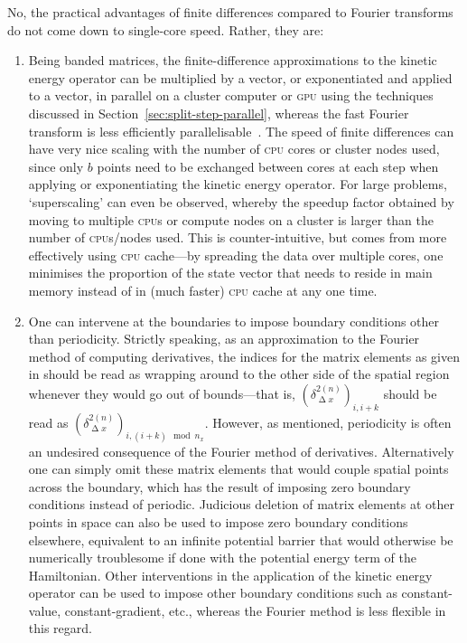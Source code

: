 No, the practical advantages of finite differences compared to Fourier transforms do not come down to single-core speed. Rather, they are:
\begin{enumerate}
    \item Being banded matrices, the finite-difference approximations to the kinetic energy operator can be multiplied by a vector, or exponentiated and applied to a vector, in parallel on a cluster computer or \textsc{gpu} using the techniques discussed in Section~\ref{sec:split-step-parallel}, whereas the fast Fourier transform is less efficiently parallelisable~\cite{Gupta93thescalability}. The speed of finite differences can have very nice scaling with the number of \textsc{cpu} cores or cluster nodes used, since only $b$ points need to be exchanged between cores at each step when applying or exponentiating the kinetic energy operator. For large problems, `superscaling' can even be observed, whereby the speedup factor obtained by moving to multiple \textsc{cpu}s or compute nodes on a cluster is larger than the number of \textsc{cpu}s/nodes used. This is counter-intuitive, but comes from more effectively using \textsc{cpu} cache---by spreading the data over multiple cores, one minimises the proportion of the state vector that needs to reside in main memory instead of in (much faster) \textsc{cpu} cache at any one time.
    \item One can intervene at the boundaries to impose boundary conditions other than periodicity. Strictly speaking, as an approximation to the Fourier method of computing derivatives, the indices for the matrix elements as given in  should be read as wrapping around to the other side of the spatial region whenever they would go out of bounds---that is, $(\delta^{2 (n)}_{\upDelta x})_{i, i + k}$ should be read as $(\delta^{2 (n)}_{\upDelta x})_{i, (i + k) \mod n_x}$. However, as mentioned, periodicity is often an undesired consequence of the Fourier method of derivatives. Alternatively one can simply omit these matrix elements that would couple spatial points across the boundary, which has the result of imposing zero boundary conditions instead of periodic. Judicious deletion of matrix elements at other points in space can also be used to impose zero boundary conditions elsewhere, equivalent to an infinite potential barrier that would otherwise be numerically troublesome if done with the potential energy term of the Hamiltonian. Other interventions in the application of the kinetic energy operator can be used to impose other boundary conditions such as constant-value, constant-gradient, etc., whereas the Fourier method is less flexible in this regard.

\end{enumerate}
